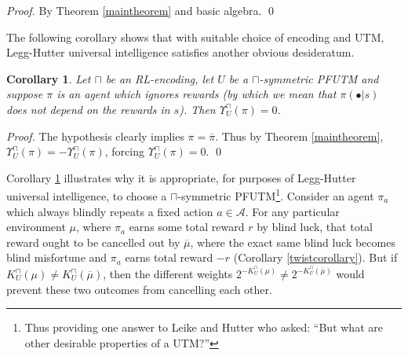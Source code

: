 \documentclass[runningheads]{llncs}
\newtheorem{mycorollary}[mytheorem]{Corollary}
\def\LH{\Upsilon}
\begin{document}
\begin{proof}
    By Theorem \ref{maintheorem} and basic algebra.
    \qed
\end{proof}

The following corollary shows that with suitable choice of encoding and UTM,
Legg-Hutter universal intelligence satisfies another obvious desideratum.

\begin{mycorollary}
\label{ignoringrewardscorollary}
    Let $\sqcap$ be an RL-encoding,
    let $U$ be a $\sqcap$-symmetric PFUTM and
    suppose $\pi$ is an agent which ignores rewards (by which we mean that
    $\pi(\bullet|s)$ does not depend on the rewards in $s$).
    Then $\LH^\sqcap_U(\pi)=0$.
\end{mycorollary}

\begin{proof}
    The hypothesis clearly implies $\pi=\overline\pi$. Thus by Theorem
    \ref{maintheorem}, $\LH^\sqcap_U(\pi)=-\LH^\sqcap_U(\pi)$,
    forcing $\LH^\sqcap_U(\pi)=0$.
    \qed
\end{proof}

Corollary \ref{ignoringrewardscorollary} illustrates why it is appropriate, for
purposes of Legg-Hutter universal intelligence, to choose a $\sqcap$-symmetric
PFUTM\footnote{Thus providing one answer to Leike and Hutter
\cite{leike2015bad} who asked: ``But what are other desirable properties of a UTM?''}.
Consider an agent $\pi_a$
which always blindly repeats a fixed action $a\in\mathcal A$.
For any particular environment $\mu$,
where $\pi_a$ earns some total reward $r$ by blind luck,
that total reward ought to be cancelled out by $\overline\mu$, where
the exact same blind luck becomes blind misfortune and $\pi_a$ earns total reward
$-r$ (Corollary \ref{twistcorollary}). But if $K^\sqcap_U(\mu)\not=K^\sqcap_U(\overline\mu)$,
then the different weights
$2^{-K^\sqcap_U(\mu)}\not=2^{-K^\sqcap_U(\overline\mu)}$ would prevent
these two outcomes from cancelling each other.
\end{document}
